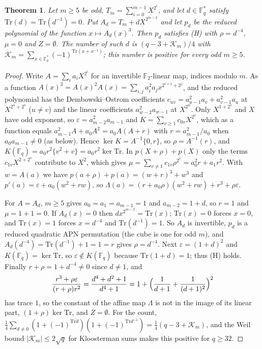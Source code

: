 \documentclass[11pt]{article}
\newtheorem{theorem}{Theorem}[section]
\theoremstyle{definition}
\theoremstyle{remark}
\newcommand{\F}{\mathbb{F}}
\newcommand{\Tr}{\mathrm{Tr}}
\begin{document}
\begin{theorem}\label{thm:repfamily}
Let $m\ge5$ be odd, $T_m=\sum_{i=0}^{m-1}X^{2^i}$, and let $d\in\F_q^*$ satisfy $\Tr(d)=\Tr(d^{-1})=0$. Put
$A_d=T_m+dX^{2^{m-2}}$ and let $p_d$ be the reduced polynomial of the function $x\mapsto A_d(x)^3$. Then $p_d$
satisfies (H) with $\rho=d^{-4}$, $\mu=0$ and $Z=\emptyset$. The number of such $d$ is $(q-3+\mathcal K_m)/4$ with
$\mathcal K_m=\sum_{x\in\F_q^*}(-1)^{\Tr(x+x^{-1})}$; this number is positive for every odd $m\ge5$.
\end{theorem}
\begin{proof}
Write $A=\sum_ia_iX^{2^i}$ for an invertible $\F_2$-linear map, indices modulo $m$. As a function
$A(x)^3=A(x)^2A(x)=\sum_{i,j}a_i^2a_jx^{2^{i+1}+2^j}$, and the reduced polynomial has the Dembowski--Ostrom coefficients
$c_{uv}=a_{u-1}^2a_v+a_{v-1}^2a_u$ at $X^{2^u+2^v}$ ($u\ne v$) and the linear coefficients $a_{w-2}^2a_{w-1}$ at
$X^{2^w}$. Only $X^{1+2^v}$ and $X$ have odd exponent, so $\varepsilon=a_{m-2}^2a_{m-1}$ and
$K=\sum_{v\ge1}c_{0v}X^{2^v}$, which as a function equals $a_{m-1}^2A+a_0A^2=a_0A(A+r)$ with $r=a_{m-1}^2/a_0$ when $a_0a_{m-1}\ne0$ (as below). Hence
$\ker K=A^{-1}\{0,r\}$, so $\rho=A^{-1}(r)$, and $K(\F_q)=a_0r^2\{v^2+v\}=a_0r^2\ker\Tr$. In $p(X+\rho)+p(X)$ only the
terms $c_{1v}X^{2+2^v}$ contribute to $X^2$, which gives $\mu=\sum_{v\ne1}c_{1v}\rho^{2^v}=a_0^2r+a_1r^2$. With
$w=A(a)$ we have $p(a+\rho)+p(a)=(w+r)^3+w^3$ and $p'(a)=\varepsilon+a_0(w^2+rw)$, so
$\Lambda(a)=(r+a_0\rho)(w^2+rw)+r^3+\rho\varepsilon$.

For $A=A_d$, $m\ge5$ gives $a_0=a_1=a_{m-1}=1$ and $a_{m-2}=1+d$, so $r=1$ and $\mu=1+1=0$. If $A_d(x)=0$ then
$dx^{2^{m-2}}=\Tr(x)$; $\Tr(x)=0$ forces $x=0$, and $\Tr(x)=1$ forces $x=d^{-4}$ and $\Tr(d^{-1})=1$. So $A_d$ is
invertible, $p_d$ is a reduced quadratic APN permutation (the cube is one for odd $m$), and
$A_d(d^{-4})=\Tr(d^{-1})+1=1=r$ gives $\rho=d^{-4}$. Next $\varepsilon=(1+d)^2$ and $K(\F_q)=\ker\Tr$, so
$\varepsilon\notin K(\F_q)$ because $\Tr(1+d)=1$; thus (H) holds. Finally $r+\rho=1+d^{-4}\ne0$ since $d\ne1$, and
\[
\frac{r^3+\rho\varepsilon}{(r+\rho)r^2}=\frac{d^4+d^2+1}{d^4+1}=1+\Bigl(\frac{1}{d+1}+\frac{1}{(d+1)^2}\Bigr)^2
\]
has trace $1$, so the constant of the affine map $\Lambda$ is not in the image of its linear part, $(1+\rho)\ker\Tr$,
and $Z=\emptyset$. For the count,
$\frac14\sum_{d\ne0}(1+(-1)^{\Tr d})(1+(-1)^{\Tr d^{-1}})=\frac14(q-3+\mathcal K_m)$, and the Weil bound
$|\mathcal K_m|\le2\sqrt q$ for Kloosterman sums makes this positive for $q\ge32$.
\end{proof}
\end{document}
